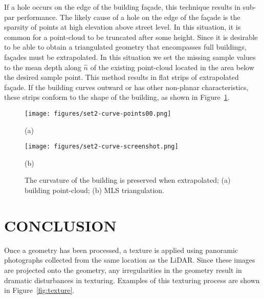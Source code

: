\documentclass{article}
\begin{document}
If a hole occurs on the edge of the building fa\c{c}ade, this technique results in sub-par performance.  The likely cause of a hole on the edge of the fa\c{c}ade is the sparsity of points at high elevation above street level.  In this situation, it is common for a point-cloud to be truncated after some height.  Since it is desirable to be able to obtain a triangulated geometry that encompasses full buildings, fa\c{c}ades must be extrapolated.  In this situation we set the missing sample values to the mean depth along $\hat{n}$ of the existing point-cloud located in the area below the desired sample point.  This method results in flat strips of extrapolated fa\c{c}ade.  If the building curves outward or has other non-planar characteristics, these strips conform to the shape of the building, as shown in Figure~\ref{fig:extrapolate}.

\begin{figure}[t]

\begin{minipage}[b]{.48\linewidth}
  \centering
  \centerline{\texttt{[image: figures/set2-curve-points00.png]}}
  \centerline{(a)}\medskip
\end{minipage}
\hfill
\begin{minipage}[b]{.48\linewidth}
  \centering
  \centerline{\texttt{[image: figures/set2-curve-screenshot.png]}}
  \centerline{(b)}\medskip
\end{minipage}
%
\caption{The curvature of the building is preserved when extrapolated; (a) building point-cloud; (b) MLS triangulation.}
\label{fig:extrapolate}
%
\end{figure}

\section{CONCLUSION}
\label{sec:conclusion}

Once a geometry has been processed, a texture is applied using panoramic photographs collected from the same location as the LiDAR.  Since these images are projected onto the geometry, any irregularities in the geometry result in dramatic disturbances in texturing.  Examples of this texturing process are shown in Figure~\ref{fig:texture}.
\end{document}
